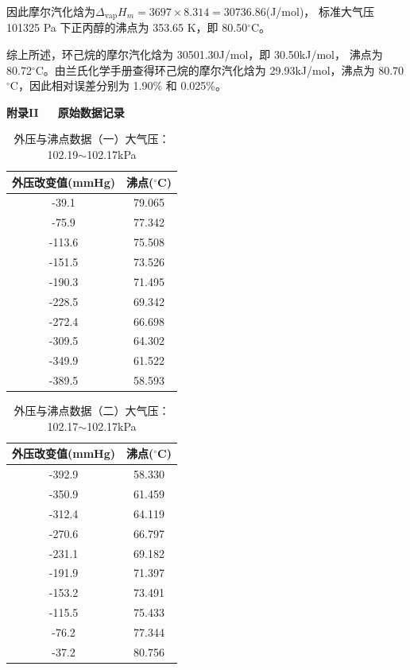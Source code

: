\documentclass[12pt]{ctexart}
\numberwithin{equation}{section}
\begin{document}
因此摩尔汽化焓为$\Delta_{\text{vap}}H_m = 3697 \times 8.314 = 30736.86$(J/mol)，
标准大气压 101325 Pa 下正丙醇的沸点为 353.65 K，即 80.50$^\circ$C。

综上所述，环己烷的摩尔汽化焓为 30501.30J/mol，即 30.50kJ/mol，
沸点为 80.72$^\circ$C。由兰氏化学手册查得环己烷的摩尔汽化焓为
29.93kJ/mol，沸点为 80.70$^\circ$C，因此相对误差分别为
1.90\% 和 0.025\%。

\newpage
\begin{center}
    \Large\bfseries{附录II~~~原始数据记录}
\end{center}

\begin{longtable}{cc}
    \caption{外压与沸点数据（一）大气压：102.19$\sim$102.17kPa} \\
    \hline
    外压改变值(mmHg) & 沸点($^\circ$C) \\
    \hline
    -39.1  & 79.065 \\
    -75.9  & 77.342 \\
    -113.6 & 75.508 \\
    -151.5 & 73.526 \\
    -190.3 & 71.495 \\
    -228.5 & 69.342 \\
    -272.4 & 66.698 \\
    -309.5 & 64.302 \\
    -349.9 & 61.522 \\
    -389.5 & 58.593 \\
    \hline
\end{longtable}

\begin{longtable}{cc}
    \caption{外压与沸点数据（二）大气压：102.17$\sim$102.17kPa} \\
    \hline
    外压改变值(mmHg) & 沸点($^\circ$C) \\
    \hline
    -392.9 & 58.330 \\
    -350.9 & 61.459 \\
    -312.4 & 64.119 \\
    -270.6 & 66.797 \\
    -231.1 & 69.182 \\
    -191.9 & 71.397 \\
    -153.2 & 73.491 \\
    -115.5 & 75.433 \\
    -76.2  & 77.344 \\
    -37.2  & 80.756 \\
    \hline
\end{longtable}
\end{document}
